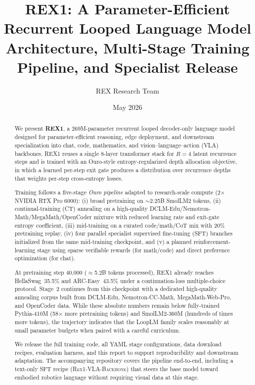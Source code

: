 \documentclass[11pt,a4paper]{article}
\title{\textbf{REX1: A Parameter-Efficient Recurrent Looped Language Model}\\[0.5em]
\large Architecture, Multi-Stage Training Pipeline, and Specialist Release}
\author{REX Research Team}
\date{May 2026}
\begin{document}
\maketitle

\begin{abstract}
We present \textbf{REX1}, a 269M-parameter recurrent looped decoder-only language model
designed for parameter-efficient reasoning, edge deployment, and downstream
specialization into chat, code, mathematics, and vision–language–action (VLA)
backbones. REX1 reuses a single 8-layer transformer stack for $R{=}4$ latent
recurrence steps and is trained with an Ouro-style entropy-regularized depth
allocation objective, in which a learned per-step exit gate produces a
distribution over recurrence depths that weights per-step cross-entropy losses.

Training follows a five-stage \emph{Ouro pipeline} adapted to research-scale
compute (2$\times$ NVIDIA RTX Pro 6000): (i) broad pretraining on
$\sim$2.25B SmolLM2 tokens, (ii) continual-training (CT) annealing on a
high-quality DCLM-Edu/Nemotron-Math/MegaMath/OpenCoder mixture with reduced
learning rate and exit-gate entropy coefficient, (iii) mid-training on a curated
code/math/CoT mix with 20\% pretraining replay, (iv) four parallel specialist
supervised fine-tuning (SFT) branches initialized from the same mid-training
checkpoint, and (v) a planned reinforcement-learning stage using sparse
verifiable rewards (for math/code) and direct preference optimization (for
chat).

At pretraining step 40{,}000 ($\approx$5.2B tokens processed), REX1 already
reaches HellaSwag~35.5\% and ARC-Easy~43.5\% under a continuation-loss
multiple-choice protocol. Stage~2 continues from this checkpoint with a
dedicated high-quality annealing corpus built from DCLM-Edu,
Nemotron-CC-Math, MegaMath-Web-Pro, and OpenCoder data.
While these absolute numbers remain below fully-trained Pythia-410M
(58$\times$ more pretraining tokens) and SmolLM2-360M (hundreds of times more
tokens), the trajectory indicates that the LoopLM family scales reasonably at
small parameter budgets when paired with a careful curriculum.

We release the full training code, all YAML stage configurations, data
download recipes, evaluation harness, and this report to support
reproducibility and downstream adaptation. The accompanying repository covers
the pipeline end-to-end, including a text-only SFT recipe (\textsc{Rex1-VLA-Backbone})
that steers the base model toward embodied robotics language without requiring
visual data at this stage.
\end{abstract}
\end{document}
